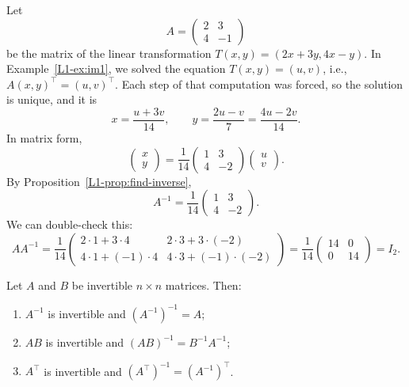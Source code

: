 \begin{example}\label{L1-ex:inverse2x2}
    Let
    \[A = \begin{pmatrix}
        2 & 3 \\
        4 & -1
    \end{pmatrix}\]
    be the matrix of the linear transformation $T(x, y) = (2x + 3y, 4x - y)$. In Example~\ref{L1-ex:im1}, we solved the equation $T(x, y) = (u, v)$, i.e., $A(x, y)^\top = (u, v)^\top$. Each step of that computation was forced, so the solution is unique, and it is
    \[x = \frac{u + 3v}{14}, \qquad y = \frac{2u - v}{7} = \frac{4u - 2v}{14}.\]
    In matrix form,
    \[\begin{pmatrix}
        x \\
        y
    \end{pmatrix} = \frac{1}{14} \begin{pmatrix}
        1 & 3 \\
        4 & -2
    \end{pmatrix} \begin{pmatrix}
        u \\
        v
    \end{pmatrix}.\]
    By Proposition~\ref{L1-prop:find-inverse},
    \[A^{-1} = \frac{1}{14} \begin{pmatrix}
        1 & 3 \\
        4 & -2
    \end{pmatrix}.\]
    We can double-check this:
    \[A A^{-1} = \frac{1}{14} \begin{pmatrix}
        2 \cdot 1 + 3 \cdot 4 & 2 \cdot 3 + 3 \cdot (-2) \\
        4 \cdot 1 + (-1) \cdot 4 & 4 \cdot 3 + (-1) \cdot (-2)
    \end{pmatrix} = \frac{1}{14} \begin{pmatrix}
        14 & 0 \\
        0 & 14
    \end{pmatrix} = I_2.\]
\end{example}

\begin{proposition}\label{L1-prop:inverse-props}
    Let $A$ and $B$ be invertible $n \times n$ matrices. Then:
    \begin{enumerate}
        \item $A^{-1}$ is invertible and $(A^{-1})^{-1} = A$;
        \item $AB$ is invertible and $(AB)^{-1} = B^{-1} A^{-1}$;
        \item $A^\top$ is invertible and $(A^\top)^{-1} = (A^{-1})^\top$.
    \end{enumerate}
\end{proposition}

